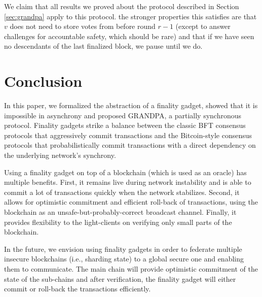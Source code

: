 \documentclass[a4paper,UKenglish,cleveref, autoref, thm-restate, anonymous]{lipics-v2019}
\begin{document}
 We claim that all results we proved about the protocol described in Section \ref{sec:grandpa} apply to this protocol. the stronger properties this satisfies are that $v$ does not need to store votes from before round $r-1$ (except to answer challenges for accountable safety, which should be rare) and that if we have seen no descendants of the last finalized block, we pause until we do. 



\section{Conclusion}

In this paper, we formalized the abstraction of a finality gadget, showed that it is impossible in asynchrony and proposed GRANDPA, a partially synchronous protocol. 
Finality gadgets strike a balance between the classic BFT consensus protocols that aggressively commit transactions and the Bitcoin-style consensus protocols that probabilistically commit transactions with a direct dependency on the underlying network's synchrony. 

Using a finality gadget on top of a blockchain (which is used as an oracle) has multiple benefits.
First, it remains live during network instability and is able to commit a lot of transactions quickly when the network stabilizes. Second, it allows for optimistic commitment and efficient roll-back of transactions, using the blockchain as an unsafe-but-probably-correct broadcast channel. Finally, it provides flexibility to the light-clients on verifying only small parts of the blockchain. 

In the future, we envision using finality gadgets in order to federate multiple insecure blockchains (i.e., sharding state) to a global secure one and enabling them to communicate. The main chain will provide optimistic commitment of the state of the sub-chains and after verification, the finality gadget will either commit or roll-back the transactions efficiently.
\end{document}
